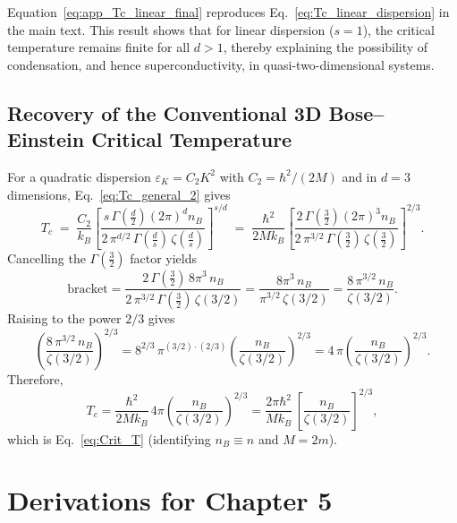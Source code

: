 Equation~\eqref{eq:app_Tc_linear_final} reproduces Eq.~\eqref{eq:Tc_linear_dispersion} in the main text.  
This result shows that for linear dispersion (\(s=1\)), the critical temperature remains finite for all \(d > 1\), thereby explaining the possibility of condensation, and hence superconductivity, in quasi-two-dimensional systems.

\section*{Recovery of the Conventional 3D Bose–Einstein Critical Temperature}
\label{d3s2}
For a quadratic dispersion \(\varepsilon_K=C_2 K^2\) with \(C_2=\hbar^2/(2M)\) and in \(d=3\) dimensions, Eq.~\eqref{eq:Tc_general_2} gives
\[
T_c \;=\; \frac{C_2}{k_B}
\left[
\frac{s\,\Gamma\!\left(\frac d2\right) (2\pi)^d n_B}
{2\,\pi^{d/2}\,\Gamma\!\left(\frac{d}{s}\right)\,\zeta\!\left(\frac{d}{s}\right)}
\right]^{s/d}
\;=\;
\frac{\hbar^2}{2 M k_B}
\left[
\frac{2\,\Gamma\!\left(\tfrac{3}{2}\right) (2\pi)^3 n_B}
{2\,\pi^{3/2}\,\Gamma\!\left(\tfrac{3}{2}\right)\,\zeta\!\left(\tfrac{3}{2}\right)}
\right]^{2/3}.
\]
Cancelling the \(\Gamma\!\left(\tfrac{3}{2}\right)\) factor yields
\[
\text{bracket}
=
\frac{2\,\Gamma\!\left(\tfrac{3}{2}\right)\, 8\pi^3\, n_B}
     {2\,\pi^{3/2}\,\Gamma\!\left(\tfrac{3}{2}\right)\,\zeta(3/2)}
=
\frac{8\pi^3\, n_B}{\pi^{3/2}\,\zeta(3/2)}
=
\frac{8\,\pi^{3/2}\, n_B}{\zeta(3/2)}.
\]
Raising to the power \(2/3\) gives
\[
\left(\frac{8\,\pi^{3/2}\, n_B}{\zeta(3/2)}\right)^{2/3}
= 8^{2/3}\,\pi^{(3/2)\cdot(2/3)} \left(\frac{n_B}{\zeta(3/2)}\right)^{2/3}
= 4\,\pi \left(\frac{n_B}{\zeta(3/2)}\right)^{2/3}.
\]
Therefore,
\[
T_c
= \frac{\hbar^2}{2 M k_B}\, 4\pi \left(\frac{n_B}{\zeta(3/2)}\right)^{2/3}
= \frac{2\pi \hbar^2}{M k_B}\,
\left[\frac{n_B}{\zeta(3/2)}\right]^{2/3},
\]
which is Eq.~\eqref{eq:Crit_T} (identifying \(n_B \equiv n\) and $M = 2m$).

\chapter{Derivations for Chapter 5}
\label{app:GL-derivation}

